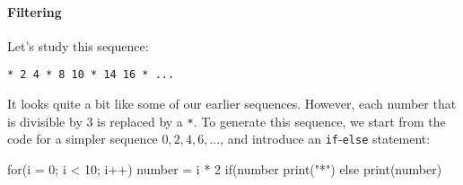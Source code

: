 \paragraph{Filtering}

Let's study this sequence:

\begin{verbatim}
* 2 4 * 8 10 * 14 16 * ...
\end{verbatim}

It looks quite a bit like some of our earlier sequences. However, each number that is divisible by 3 is replaced by a \texttt{*}. To generate this sequence, we start from the code for a simpler sequence $0, 2, 4, 6, ...$, and introduce an \texttt{if}-\texttt{else} statement:

\begin{nnflisting}
for(i = 0; i < 10; i++)
    number = i * 2
    if(number %
        print("*")
    else
        print(number)
\end{nnflisting}


%
%






